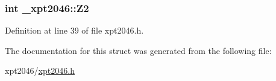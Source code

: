 \subsubsection[{\texorpdfstring{Z2}{Z2}}]{\setlength{\rightskip}{0pt plus 5cm}int \+\_\+xpt2046\+::\+Z2}\hypertarget{struct__xpt2046_af0cfbd929b6b3ae00d926aed6bd2dbcf}{}\label{struct__xpt2046_af0cfbd929b6b3ae00d926aed6bd2dbcf}


Definition at line 39 of file xpt2046.\+h.



The documentation for this struct was generated from the following file\+:\begin{DoxyCompactItemize}
\item 
xpt2046/\hyperlink{xpt2046_8h}{xpt2046.\+h}\end{DoxyCompactItemize}
